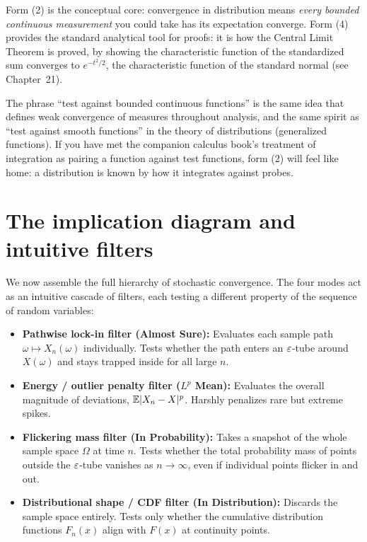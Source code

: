 Form (2) is the conceptual core: convergence in distribution means \emph{every
bounded continuous measurement} you could take has its expectation converge. Form (4) provides
the standard analytical tool for proofs: it is how the Central Limit Theorem is proved,
by showing the characteristic function of the standardized sum converges to
$e^{-t^2/2}$, the characteristic function of the standard normal (see Chapter~21).

\begin{connectionbox}
The phrase ``test against bounded continuous functions'' is the same idea that defines
weak convergence of measures throughout analysis, and the same spirit as ``test
against smooth functions'' in the theory of distributions (generalized functions). If
you have met the companion calculus book's treatment of integration as pairing a
function against test functions, form (2) will feel like home: a distribution is
known by how it integrates against probes.
\end{connectionbox}

\section{The implication diagram and intuitive filters}
\label{ch22:diagram}

We now assemble the full hierarchy of stochastic convergence. The four modes
act as an intuitive cascade of filters, each testing a different property of the
sequence of random variables:
\begin{itemize}
  \item \textbf{Pathwise lock-in filter (Almost Sure):} Evaluates each sample path $\omega \mapsto X_n(\omega)$ individually. Tests whether the path enters an $\varepsilon$-tube around $X(\omega)$ and stays trapped inside for all large $n$.
  \item \textbf{Energy / outlier penalty filter ($L^p$ Mean):} Evaluates the overall magnitude of deviations, $\operatorname{\mathbb{E}}\lvert X_n - X\rvert^p$. Harshly penalizes rare but extreme spikes.
  \item \textbf{Flickering mass filter (In Probability):} Takes a snapshot of the whole sample space $\Omega$ at time $n$. Tests whether the total probability mass of points outside the $\varepsilon$-tube vanishes as $n \to \infty$, even if individual points flicker in and out.
  \item \textbf{Distributional shape / CDF filter (In Distribution):} Discards the sample space entirely. Tests only whether the cumulative distribution functions $F_n(x)$ align with $F(x)$ at continuity points.
\end{itemize}

